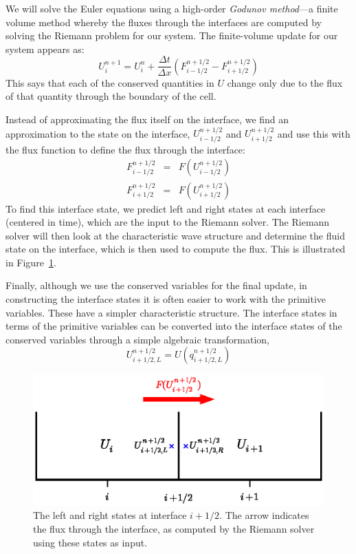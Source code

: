 \label{sec:onedrecon}

We will solve the Euler equations using a high-order {\em Godunov
  method}---a finite volume method whereby the fluxes through the
interfaces are computed by solving the Riemann problem for our system.
The finite-volume update for our system appears as:
\begin{equation}
U^{n+1}_i = U^n_i + \frac{\Delta t}{\Delta x} \left ( F_{i-1/2}^{n+1/2} - F_{i+1/2}^{n+1/2} \right )
\end{equation}
This says that each of the conserved quantities in $U$ change only due
to the flux of that quantity through the boundary of the cell.

Instead of approximating the flux itself on the interface, we find an
approximation to the state on the interface, $U_{i-1/2}^{n+1/2}$ and
$U_{i+1/2}^{n+1/2}$ and use this with the flux function to define the
flux through the interface:
\begin{eqnarray}
F_{i-1/2}^{n+1/2} &=& F(U_{i-1/2}^{n+1/2}) \\
F_{i+1/2}^{n+1/2} &=& F(U_{i+1/2}^{n+1/2})
\end{eqnarray}
To find this interface state, we predict left and right states at each
interface (centered in time), which are the input to the Riemann
solver.  The Riemann solver will then look at the characteristic wave
structure and determine the fluid state on the interface, which is
then used to compute the flux.  This is illustrated in
Figure~\ref{fig:riemann}.  

Finally, although we use the conserved variables for the final update,
in constructing the interface states it is often easier to work with
the primitive variables.  These have a simpler characteristic
structure.  The interface states in terms of the primitive variables
can be converted into the interface states of the conserved variables
through a simple algebraic transformation, 
\begin{equation}
U_{i+1/2,L}^{n+1/2} = U(q_{i+1/2,L}^{n+1/2})
\end{equation}

\begin{figure}[t]
\centering
\includegraphics[width=\linewidth]{riemann}
\caption[The left and right states for the Riemann
  problem.]{\label{fig:riemann} The left and right states at interface
  $i+1/2$.  The arrow indicates the flux through the interface, as
  computed by the Riemann solver using these states as input.}
\end{figure}

